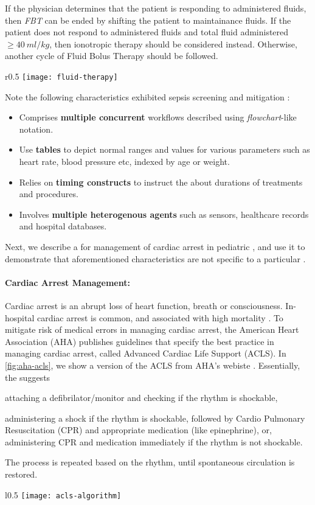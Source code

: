 If the physician determines that the patient is responding to
administered fluids, then \emph{FBT} can be ended by
shifting the patient to maintainance fluids.
If the patient does not respond to administered fluids and
total fluid administered $\geq 40\ ml/kg$, then ionotropic therapy
should be considered instead. Otherwise, another cycle of
Fluid Bolus Therapy should be followed.

\begin{wrapfigure}[16]{r}{0.5\textwidth}
  \centering
  \texttt{[image: fluid-therapy]}
  \caption{Fluid Bolus Therapy \BPG{}}\label{fig:fluid-therapy}
\end{wrapfigure}

Note the following characteristics exhibited sepsis screening and mitigation \BPG{}:
\begin{itemize}[leftmargin=*]
  \item Comprises \textbf{multiple concurrent} workflows described using
\emph{flowchart}-like notation.
  \item Use \textbf{tables} to depict normal
ranges and values for various parameters such as heart rate, blood pressure etc,
indexed by age or weight.
  \item Relies on \textbf{timing constructs} to instruct the \HCP{} about
    durations of treatments and procedures.
  \item Involves  \textbf{multiple heterogenous agents} such as sensors,
    healthcare records and hospital databases.
\end{itemize}
Next, we describe a \BPG{} for management of cardiac arrest in pediatric \EDs,
and use it to demonstrate that aforementioned characteristics are not
specific to a particular \BPG{}.

\paragraph{Cardiac Arrest Management:}

Cardiac arrest is an abrupt loss of heart function, breath or consciousness.
In-hospital cardiac arrest is common, and associated with high mortality
\cite{AndersenJAMA19}. To mitigate risk of medical errors in managing cardiac
arrest, the American Heart Association (AHA) publishes guidelines that specify
the best practice in managing cardiac arrest, called Advanced Cardiac
Life Support (ACLS). In \figurename \ref{fig:aha-acls},
we show a version of the ACLS \BPG{} from AHA's webiste \cite{acls-url}.
Essentially, the \BPG{} suggests
\begin{enumerate*}[label=(\roman*)]
  \item attaching a defibrilator/monitor and checking if the rhythm is
    shockable,
  \item administering a shock if the rhythm is shockable, followed by
    Cardio Pulmonary Resuscitation (CPR)
    and appropriate medication (like epinephrine), or,
    administering CPR and medication immediately if the rhythm is not shockable.
\end{enumerate*}
The process is repeated based on the rhythm, until spontaneous circulation is restored.

\begin{wrapfigure}{l}{0.5\textwidth}
  \centering
  \texttt{[image: acls-algorithm]}
  \caption{Advanced Cardiac Life Support (ACLS) \BPG{}}\label{fig:aha-acls}
\end{wrapfigure}
